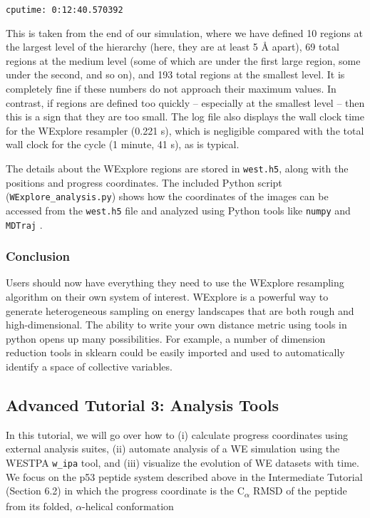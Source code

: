 \documentclass[9pt,tutorial,ASAPversion]{livecoms}
\begin{document}
\verb|cputime: 0:12:40.570392|

This is taken from the end of our simulation, where we have defined 10 regions at the largest level of the hierarchy (here, they are at least 5 \AA{} apart), 69 total regions at the medium level (some of which are under the first large region, some under the second, and so on), and 193 total regions at the smallest level. 
It is completely fine if these numbers do not approach their maximum values. 
In contrast, if regions are defined too quickly – especially at the smallest level – then this is a sign that they are too small.  
The log file also displays the wall clock time for the WExplore resampler (0.221 s), which is negligible compared with the total wall clock for the cycle (1 minute, 41 s), as is typical.

The details about the WExplore regions are stored in \verb|west.h5|, along with the positions and progress coordinates. 
The included Python script (\verb|WExplore_analysis.py|) shows how the coordinates of the images can be accessed from the \verb|west.h5| file and analyzed using Python tools like \verb|numpy| and \verb|MDTraj| \citep{mdt2015}.

\subsubsection{Conclusion}

Users should now have everything they need to use the WExplore resampling algorithm on their own system of interest.  
WExplore is a powerful way to generate heterogeneous sampling on energy landscapes that are both rough and high-dimensional. 
The ability to write your own distance metric using tools in python opens up many possibilities. 
For example, a number of dimension reduction tools in sklearn could be easily imported and used to automatically identify a space of collective variables.  

\subsection{Advanced Tutorial 3: Analysis Tools}

In this tutorial, we will go over how to (i) calculate progress coordinates using external analysis suites, (ii) automate analysis of a WE simulation using the WESTPA \verb|w_ipa| tool, and (iii) visualize the evolution of WE datasets with time. 
We focus on the p53 peptide system described above in the Intermediate Tutorial (Section 6.2) in which the progress coordinate is the C\textsubscript{$\alpha$} RMSD of the peptide from its folded, $\alpha$-helical conformation
\end{document}
